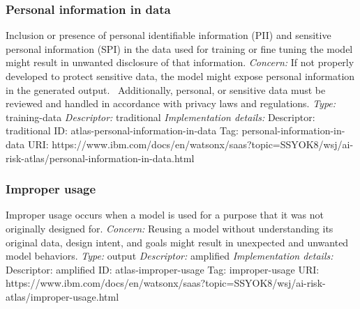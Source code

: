 \documentclass{article}
\begin{document}
\subsubsection*{Personal information in data}
Inclusion or presence of personal identifiable information (PII) and sensitive personal information (SPI) in the data used for training or fine tuning the model might result in unwanted disclosure of that information.\newline
\textit{Concern: }If not properly developed to protect sensitive data, the model might expose personal information in the generated output.  Additionally, personal, or sensitive data must be reviewed and handled in accordance with privacy laws and regulations.\newline\newline
\textit{Type: }training-data\newline
\textit{Descriptor: }traditional \newline\newline
\textit{Implementation details:} \newline
Descriptor: traditional \newline
ID: atlas-personal-information-in-data \newline
Tag: personal-information-in-data \newline
URI:  https://www.ibm.com/docs/en/watsonx/saas?topic=SSYOK8/wsj/ai-risk-atlas/personal-information-in-data.html\newline
\subsubsection*{Improper usage}
Improper usage occurs when a model is used for a purpose that it was not originally designed for.\newline
\textit{Concern: }Reusing a model without understanding its original data, design intent, and goals might result in unexpected and unwanted model behaviors.\newline\newline
\textit{Type: }output\newline
\textit{Descriptor: }amplified \newline\newline
\textit{Implementation details:} \newline
Descriptor: amplified \newline
ID: atlas-improper-usage \newline
Tag: improper-usage \newline
URI:  https://www.ibm.com/docs/en/watsonx/saas?topic=SSYOK8/wsj/ai-risk-atlas/improper-usage.html\newline
\end{document}
